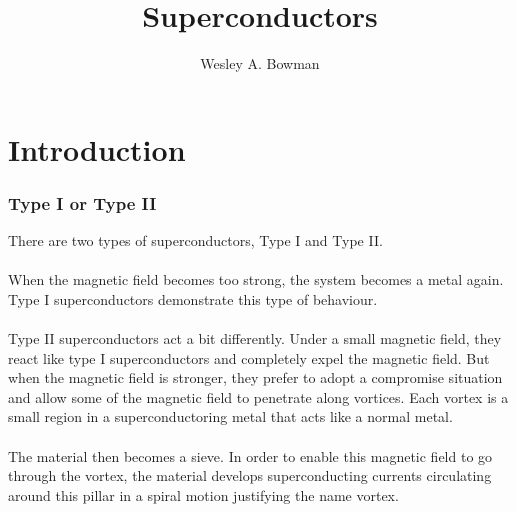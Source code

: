 \documentclass[10pt]{beamer}
\title[Statistical Mechanics Presentation]{Superconductors}
\author[W. Bowman]{\Large Wesley A. Bowman}
\institute[Acadia University]{\Large Acadia University \\ \normalsize Physics Department}
\theoremstyle{definition}
\begin{document}
\begin{frame}
    \titlepage
\end{frame}


\section{Introduction}

\begin{frame}
    \frametitle{Type I or Type II}

    There are two types of superconductors, Type I and Type II\@.
    \\~\\

    When the magnetic field becomes too strong, the system becomes 
    a metal again. Type I superconductors demonstrate this type of behaviour.
    \\~\\

    Type II superconductors act a bit differently.
    Under a small magnetic field, they react like type I superconductors
    and completely expel the magnetic field. But when the magnetic field 
    is stronger, they prefer to adopt a compromise situation and allow 
    some of the magnetic field to penetrate along vortices. Each vortex is a
    small region in a superconductoring metal that acts like a normal metal.
    \\~\\

    The material then becomes a sieve. In order to enable this magnetic 
    field to go through the vortex, the material develops superconducting 
    currents circulating around this pillar in a spiral motion justifying 
    the name vortex.

\end{frame}
\end{document}
